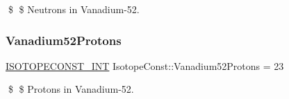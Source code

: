 \$ \$ Neutrons in Vanadium-\/52. \mbox{\label{group___isotope_const-_vanadium-_v52_gadf8ec3688cdda9a07f1094357a00131d}} 
\subsubsection{\texorpdfstring{Vanadium52\+Protons}{Vanadium52Protons}}
{\footnotesize\ttfamily \mbox{\hyperlink{group___isotope_const-_macros_ga5f18360b3e99483a35c32d789e62621c}{I\+S\+O\+T\+O\+P\+E\+C\+O\+N\+S\+T\+\_\+\+I\+NT}} Isotope\+Const\+::\+Vanadium52\+Protons = 23}

\$ \$ Protons in Vanadium-\/52. 